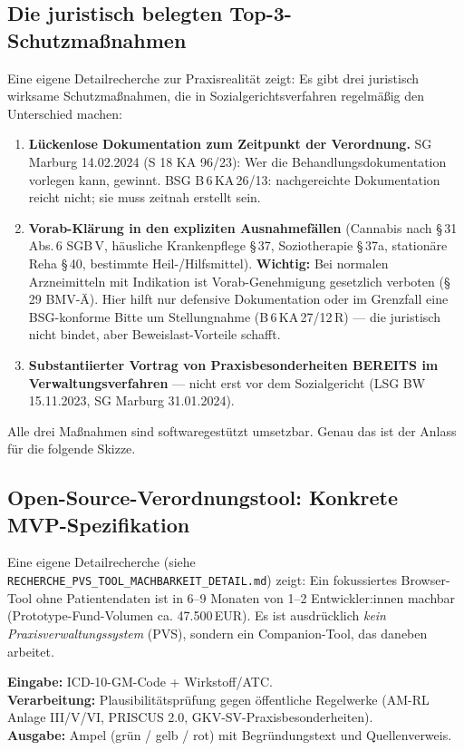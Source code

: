 \documentclass{umbruch-position}
\begin{document}
\subsection{Die juristisch belegten Top-3-Schutzmaßnahmen}

Eine eigene Detailrecherche zur Praxisrealität zeigt: Es gibt drei juristisch wirksame Schutzmaßnahmen, die in Sozialgerichtsverfahren regelmäßig den Unterschied machen:

\begin{enumerate}
  \item \textbf{Lückenlose Dokumentation zum Zeitpunkt der Verordnung.} SG Marburg 14.02.2024 (S 18 KA 96/23): Wer die Behandlungsdokumentation vorlegen kann, gewinnt. BSG B\,6\,KA\,26/13: nachgereichte Dokumentation reicht nicht; sie muss zeitnah erstellt sein.
  \item \textbf{Vorab-Klärung in den expliziten Ausnahmefällen} (Cannabis nach \S\,31 Abs.\,6 SGB\,V, häusliche Krankenpflege \S\,37, Soziotherapie \S\,37a, stationäre Reha \S\,40, bestimmte Heil-/Hilfsmittel). \textbf{Wichtig:} Bei normalen Arzneimitteln mit Indikation ist Vorab-Genehmigung gesetzlich verboten (\S\,29 BMV-Ä). Hier hilft nur defensive Dokumentation oder im Grenzfall eine BSG-konforme Bitte um Stellungnahme (B\,6\,KA\,27/12\,R) — die juristisch nicht bindet, aber Beweislast-Vorteile schafft.
  \item \textbf{Substantiierter Vortrag von Praxisbesonderheiten BEREITS im Verwaltungsverfahren} — nicht erst vor dem Sozialgericht (LSG BW 15.11.2023, SG Marburg 31.01.2024).
\end{enumerate}

Alle drei Maßnahmen sind softwaregestützt umsetzbar. Genau das ist der Anlass für die folgende Skizze.

\subsection{Open-Source-Verordnungstool: Konkrete MVP-Spezifikation}

Eine eigene Detailrecherche (siehe \texttt{RECHERCHE\_PVS\_TOOL\_MACHBARKEIT\_DETAIL.md}) zeigt: Ein fokussiertes Browser-Tool ohne Patientendaten ist in 6--9 Monaten von 1--2 Entwickler:innen machbar (Prototype-Fund-Volumen ca. 47.500\,EUR). Es ist ausdrücklich \textit{kein Praxisverwaltungssystem} (PVS), sondern ein Companion-Tool, das daneben arbeitet.

\textbf{Eingabe:} ICD-10-GM-Code + Wirkstoff/ATC.\\
\textbf{Verarbeitung:} Plausibilitätsprüfung gegen öffentliche Regelwerke (AM-RL Anlage III/V/VI, PRISCUS 2.0, GKV-SV-Praxisbesonderheiten).\\
\textbf{Ausgabe:} Ampel (grün / gelb / rot) mit Begründungstext und Quellenverweis.
\end{document}
